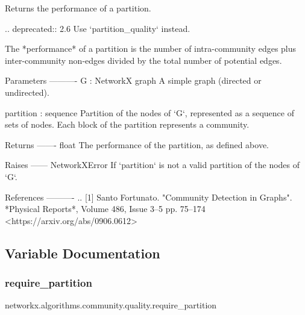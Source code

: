 \begin{DoxyVerb}Returns the performance of a partition.

.. deprecated:: 2.6
   Use `partition_quality` instead.

The *performance* of a partition is the number of
intra-community edges plus inter-community non-edges divided by the total
number of potential edges.

Parameters
----------
G : NetworkX graph
    A simple graph (directed or undirected).

partition : sequence
    Partition of the nodes of `G`, represented as a sequence of
    sets of nodes. Each block of the partition represents a
    community.

Returns
-------
float
    The performance of the partition, as defined above.

Raises
------
NetworkXError
    If `partition` is not a valid partition of the nodes of `G`.

References
----------
.. [1] Santo Fortunato.
       "Community Detection in Graphs".
       *Physical Reports*, Volume 486, Issue 3--5 pp. 75--174
       <https://arxiv.org/abs/0906.0612>\end{DoxyVerb}
 

\subsection{Variable Documentation}
\mbox{\label{namespacenetworkx_1_1algorithms_1_1community_1_1quality_ab7ddd6a98c5019ab29f5ded31bd2df81}} 
\subsubsection{\texorpdfstring{require\+\_\+partition}{require\_partition}}
{\footnotesize\ttfamily networkx.\+algorithms.\+community.\+quality.\+require\+\_\+partition}

